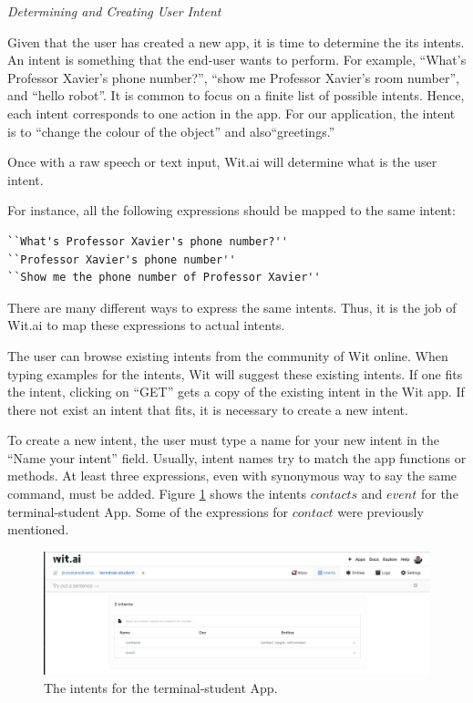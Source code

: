 
\emph{Determining and Creating User Intent}

Given that the user has created a new app, it is time to determine the its intents.
An intent is something that the end-user wants to perform.
For example,
``What's Professor Xavier's phone number?'', 
``show me Professor Xavier's room number'', and 
``hello robot''.
It is common to focus on a finite list of possible intents.
Hence, each intent corresponds to one action in the app.
For our application, the intent is to ``change the colour of the object'' and also``greetings.''

Once with a raw speech or text input, Wit.ai will determine what is the user intent.

For instance, all the following expressions should be mapped to the same intent:
\begin{lstlisting}[language=html]
``What's Professor Xavier's phone number?''
``Professor Xavier's phone number''
``Show me the phone number of Professor Xavier''
\end{lstlisting}


There are many different ways to express the same intents. 
Thus, it is the job of Wit.ai to map these expressions to actual intents.

The user can browse existing intents from the community of Wit online.
When typing examples for the intents, Wit will suggest these existing intents. 
If one fits the intent, clicking on “GET” gets a copy of the existing intent in the Wit app.
If there not exist an intent that fits, it is necessary to create a new intent.

To create a new intent, the user must type a name for your new intent in the ``Name your intent'' field.
Usually, intent names try to match the app functions or methods. 
At least three expressions, even with synonymous way to say the same command, must be added.
Figure \ref{fig:entents} shows the intents $contacts$ and $event$ for the terminal-student App.
Some of the expressions for $contact$ were previously mentioned.

\begin{figure}[!h]
    \includegraphics[width=\textwidth]{figures/entities.png}
    \caption{The intents for the terminal-student App.}
    \label{fig:entents}
\end{figure}


